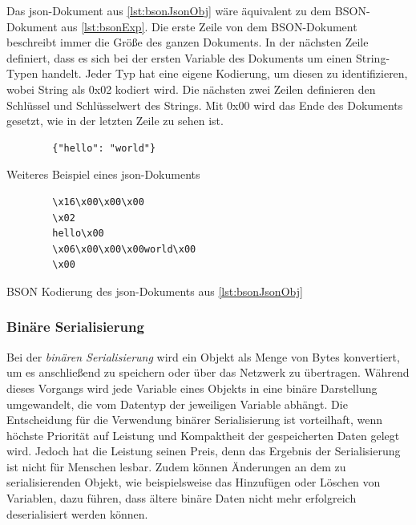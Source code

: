Das \ac{json}-Dokument aus \ref{lst:bsonJsonObj} wäre äquivalent zu dem BSON-Dokument aus \ref{lst:bsonExp}. Die erste Zeile von dem BSON-Dokument beschreibt immer die Größe des ganzen Dokuments. In der nächsten Zeile definiert, dass es sich bei der ersten Variable des Dokuments um einen String-Typen handelt. Jeder Typ hat eine eigene Kodierung, um diesen zu identifizieren, wobei String als 0x02 kodiert wird. Die nächsten zwei Zeilen definieren den Schlüssel und Schlüsselwert des Strings. Mit 0x00 wird das Ende des Dokuments gesetzt, wie in der letzten Zeile zu sehen ist.

\begin{listing}[htp]
    \begin{verbatim}
        {"hello": "world"}
    \end{verbatim}
    \caption{Weiteres Beispiel eines \ac{json}-Dokuments \cite{mongodbJSONBSON}}
    \label{lst:bsonJsonObj}
\end{listing} 

\begin{listing}[htp]
    \begin{verbatim} 
        \x16\x00\x00\x00           
        \x02                      
        hello\x00                  
        \x06\x00\x00\x00world\x00  
        \x00                       
    \end{verbatim}
    \caption{BSON Kodierung des \ac{json}-Dokuments aus \ref{lst:bsonJsonObj} \cite{mongodbJSONBSON}}
    \label{lst:bsonExp}
\end{listing}

\subsubsection{Binäre Serialisierung} \label{sssec:binSerialisierung}
Bei der \textit{binären Serialisierung} wird ein Objekt als Menge von Bytes konvertiert, um es anschließend zu speichern oder über das Netzwerk zu übertragen. Während dieses Vorgangs wird jede Variable eines Objekts in eine binäre Darstellung umgewandelt, die vom Datentyp der jeweiligen Variable abhängt. Die Entscheidung für die Verwendung binärer Serialisierung ist vorteilhaft, wenn höchste Priorität auf Leistung und Kompaktheit der gespeicherten Daten gelegt wird. Jedoch hat die Leistung seinen Preis, denn das Ergebnis der Serialisierung ist nicht für Menschen lesbar. Zudem können Änderungen an dem zu serialisierenden Objekt, wie beispielsweise das Hinzufügen oder Löschen von Variablen, dazu führen, dass ältere binäre Daten nicht mehr erfolgreich deserialisiert werden können.\cite{microsoftBinarySerialization}\cite{programmathicallyUnderstandingBinary}

